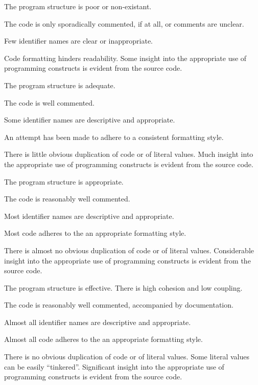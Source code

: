 \documentclass{../../fal_assignment}
\begin{document}
\begin{markingrubric}
            \par The program structure is poor or non-existant.
            \par The code is only sporadically commented, if at all, or comments are unclear.
            \par Few identifier names are clear or inappropriate.
            \par Code formatting hinders readability.
        \grade Some insight into the appropriate use of programming constructs is evident from the source code.
            \par The program structure is adequate.
            \par The code is well commented.
            \par Some identifier names are descriptive and appropriate.
            \par An attempt has been made to adhere to a consistent formatting style.
             \par There is little obvious duplication of code or of literal values.   
        \grade Much insight into the appropriate use of programming constructs is evident from the source code.
            \par The program structure is appropriate.
            \par The code is reasonably well commented.
            \par Most identifier names are descriptive and appropriate.
            \par Most code adheres to the an appropriate formatting style.
             \par There is almost no obvious duplication of code or of literal values.
        \grade Considerable insight into the appropriate use of programming constructs is evident from the source code.
            \par The program structure is effective. There is high cohesion and low coupling.
            \par The code is reasonably well commented, accompanied by documentation.
            \par Almost all identifier names are descriptive and appropriate.
            \par Almost all code adheres to the an appropriate formatting style.
             \par There is no obvious duplication of code or of literal values. Some literal values can be easily ``tinkered''. 
        \grade Significant insight into the appropriate use of programming constructs is evident from the source code.

\end{markingrubric}
\end{document}
